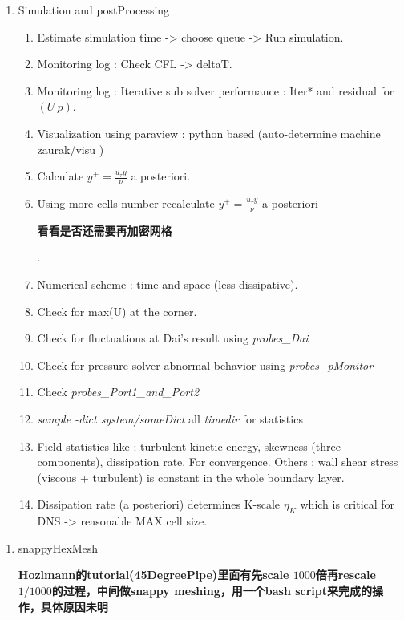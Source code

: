 \documentclass[a4paper,10pt]{article}
\begin{document}
\begin{enumerate}
\item Simulation and postProcessing
	\begin{enumerate}
	\item Estimate simulation time -> choose queue -> Run simulation. 
	\item Monitoring log : Check CFL -> deltaT. 
	\item Monitoring log : Iterative sub solver performance : Iter* and residual for $(U\ p)$. 
	\item Visualization using paraview : python based (auto-determine machine zaurak/visu )
	\item Calculate $y^+ = \frac{u_\tau y}{\nu}$ a posteriori. 
	\item Using more cells number recalculate $y^+ = \frac{u_\tau y}{\nu}$ a posteriori \begin{CJK*}{UTF8}{gkai} \textbf{看看是否还需要再加密网格} \end{CJK*}. 
	\item Numerical scheme : time and space (less dissipative). 
	\item Check for max(U) at the corner. 
	\item Check for fluctuations at Dai's result using \textit{probes\_Dai} 
	\item Check for pressure solver abnormal behavior using \textit{probes\_pMonitor} 
	\item Check \textit{probes\_Port1\_and\_Port2} 
	\item \textit{sample -dict system/someDict} all \textit{timedir} for statistics 
	\item Field statistics like : turbulent kinetic energy, skewness (three components), dissipation rate. For convergence. Others : wall shear stress (viscous + turbulent) is constant in the whole boundary layer.
	\item Dissipation rate (a posteriori) determines K-scale $\eta_K$ which is critical for DNS -> reasonable MAX cell size. \\
	\end{enumerate}

\end{enumerate}

\begin{enumerate}
\item snappyHexMesh
\begin{CJK*}{UTF8}{gkai} 
\textbf{Hozlmann的tutorial(45DegreePipe)里面有先scale $1000$倍再rescale $1/1000$的过程，中间做snappy meshing，用一个bash script来完成的操作，具体原因未明} 
\end{CJK*}

\end{enumerate}
\end{document}
